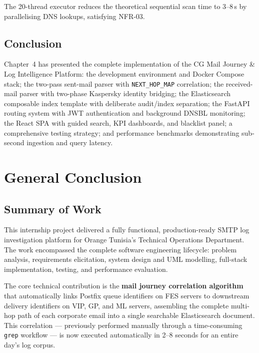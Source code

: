 \documentclass[12pt,a4paper,oneside]{report}
\begin{document}
The 20-thread executor reduces the theoretical sequential scan time to 3--8\,s by parallelising DNS lookups, satisfying NFR-03.

\section{Conclusion}

Chapter~4 has presented the complete implementation of the CG Mail Journey \& Log Intelligence Platform:
the development environment and Docker Compose stack;
the two-pass sent-mail parser with \texttt{NEXT\_HOP\_MAP} correlation;
the received-mail parser with two-phase Kaspersky identity bridging;
the Elasticsearch composable index template with deliberate audit/index separation;
the FastAPI routing system with JWT authentication and background DNSBL monitoring;
the React SPA with guided search, KPI dashboards, and blacklist panel;
a comprehensive testing strategy; and performance benchmarks demonstrating sub-second ingestion and query latency.

\chapter*{General Conclusion}
{}

\section*{Summary of Work}
{}

This internship project delivered a fully functional, production-ready SMTP log investigation platform for Orange Tunisia's Technical Operations Department.
The work encompassed the complete software engineering lifecycle: problem analysis, requirements elicitation, system design and UML modelling, full-stack implementation, testing, and performance evaluation.

The core technical contribution is the \textbf{mail journey correlation algorithm} that automatically links Postfix queue identifiers on FES servers to downstream delivery identifiers on VIP, GP, and ML servers, assembling the complete multi-hop path of each corporate email into a single searchable Elasticsearch document.
This correlation --- previously performed manually through a time-consuming \texttt{grep} workflow --- is now executed automatically in 2--8 seconds for an entire day's log corpus.
\end{document}
